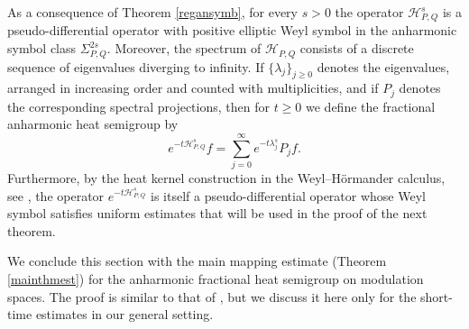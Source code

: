 \documentclass[12pt, reqno]{amsart}
\theoremstyle{definition}
\theoremstyle{remark}
\numberwithin{equation}{section}
\newcommand{\APQ}{\mathcal{H}_{P, Q}}
\begin{document}
As a consequence of Theorem \ref{regansymb}, for every $s>0$ the operator $\mathcal H_{P,Q}^s$ is a pseudo-differential operator with positive elliptic Weyl symbol in the anharmonic symbol class $\Sigma_{P,Q}^{2s}$. Moreover, the spectrum of $\mathcal H_{P,Q}$ consists of a discrete sequence of eigenvalues diverging to infinity. If $\{\lambda_j\}_{j\geq0}$ denotes the eigenvalues, arranged in increasing order and counted with multiplicities, and if $P_j$ denotes the corresponding spectral projections, then for $t\geq0$ we define the fractional anharmonic heat semigroup by
\[
e^{-t\APQ^s}f
=
\sum_{j=0}^{\infty}
e^{-t\lambda_j^s}P_jf.
\]
Furthermore, by the heat kernel construction in the Weyl--H\"ormander calculus, see \cite[Theorem 4.5.1]{NicolaRodino}, the operator $e^{-t\APQ^s}$ is itself a pseudo-differential operator whose Weyl symbol satisfies uniform estimates that will be used in the proof of the next theorem.



We conclude this section with the main mapping estimate (Theorem \ref{mainthmest}) for the anharmonic fractional heat semigroup on modulation spaces. The proof is similar to that of \cite{Cardona}, but we discuss it here only for the short-time estimates in our general setting.
\end{document}
